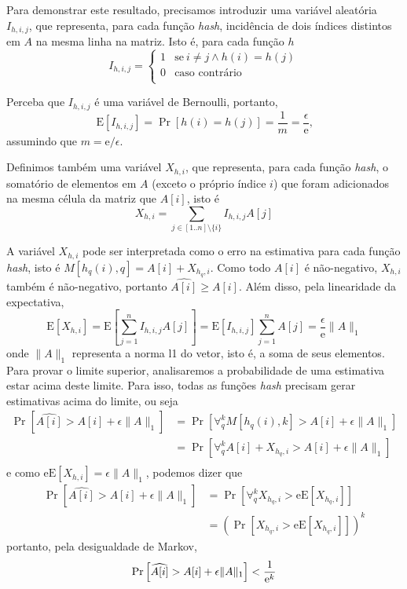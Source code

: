 Para demonstrar este resultado, precisamos introduzir uma variável aleatória $I_{h,i,j}$, que representa, para cada função \emph{hash}, incidência de dois índices distintos em $A$ na mesma linha na matriz. Isto é, para cada função $h$
\[
    I_{h,i,j} = \begin{cases} 
        1 & \text{se}\ i \neq j \wedge h(i) = h(j) \\
        0 & \text{caso contrário} \\
    \end{cases}
\]

Perceba que $I_{h,i,j}$ é uma variável de Bernoulli, portanto, 
\[
\text{E}[I_{h,i,j}] = \Pr[h(i) = h(j)] = \frac{1}{m} = \frac{\epsilon}{\mathrm{e}}\textrm{,}
\] assumindo que $m = \mathrm{e}/\epsilon$.

Definimos também uma variável $X_{h, i}$, que representa, para cada função \emph{hash}, o somatório de elementos em $A$ (exceto o próprio índice $i$) que foram adicionados na mesma célula da matriz que $A[i]$, isto é
\[
    X_{h, i} = \sum_{j \in [1..n] \setminus \{i\}} I_{h,i,j} A[j]
\]

A variável $X_{h, i}$ pode ser interpretada como o erro na estimativa para cada função \emph{hash}, isto é $M[h_q(i), q] = A[i] + X_{h_q, i}$. Como todo $A[i]$ é não-negativo, $X_{h, i}$ também é não-negativo, portanto $\widehat{A[i]} \geq A[i]$. Além disso, pela linearidade da expectativa, 
\[
    \text{E}[X_{h, i}] = \text{E} \left[ \sum_{j=1}^{n} I_{h,i,j} A[j] \right] =  \text{E}[I_{h,i,j}] \sum_{j=1}^{n}A[j] = \frac{\epsilon}{\mathrm{e}} \lVert A \rVert_1
\] onde $\lVert A \rVert_1$ representa a norma l1 do vetor, isto é, a soma de seus elementos. Para provar o limite superior, analisaremos a probabilidade de uma estimativa estar acima deste limite. Para isso, todas as funções \emph{hash} precisam gerar estimativas acima do limite, ou seja
\begin{align*}
    \Pr\left[ \widehat{A[i]} > A[i] + \epsilon \lVert A \rVert_1\right] 
    &= \Pr\left[ \forall_q^k M[h_q(i), k] > A[i] + \epsilon \lVert A \rVert_1 \right] \\
    &= \Pr\left[ \forall_q^k A[i] + X_{h_q,i} > A[i] + \epsilon \lVert A \rVert_1 \right] \\
\end{align*}
e como $\mathrm{e} \text{E}[X_{h, i}] = \epsilon \lVert A \rVert_1$, podemos dizer que
\begin{align*}    
    \Pr\left[ \widehat{A[i]} > A[i] + \epsilon \lVert A \rVert_1\right] 
    &= \Pr\left[ \forall_q^k X_{h_q,i} > \mathrm{e} \text{E} [X_{h_q,i}] \right] \\
    &= (\Pr\left[ X_{h_q,i} > \mathrm{e} \text{E} [X_{h_q,i}] \right])^k
\end{align*}
portanto, pela desigualdade de Markov,
\[
    \Pr\left[ \widehat{A[i]} > A[i] + \epsilon \lVert A \rVert_1 \right] < \frac{1}{\mathrm{e}^k} \\
\]

